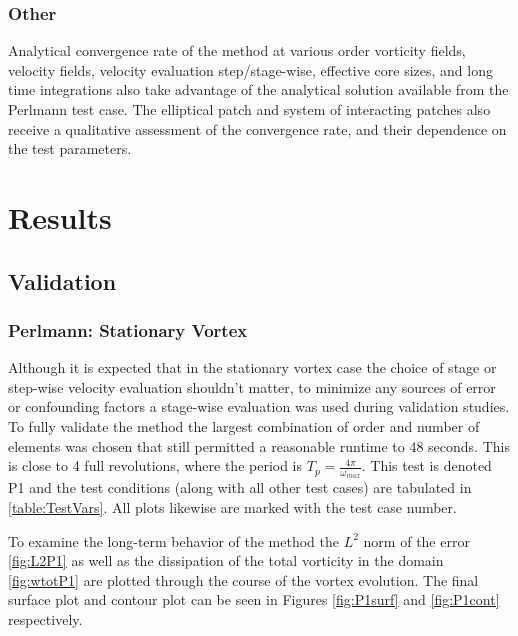 \documentclass[letterpaper,12pt]{report}
\begin{document}
\subsection{Other}
Analytical convergence rate of the method at various order vorticity fields, velocity fields, velocity evaluation step/stage-wise, effective core sizes, and long time integrations also take advantage of the analytical solution available from the Perlmann test case. The elliptical patch and system of interacting  patches also receive a qualitative assessment of the convergence rate, and their dependence on the test parameters.

\chapter{Results}
\section{Validation}
\subsection{Perlmann: Stationary Vortex}
Although it is expected that in the stationary vortex case the choice of stage or step-wise velocity evaluation shouldn't matter, to minimize any sources of error or confounding factors a stage-wise evaluation was used during validation studies. To fully validate the method the largest combination of order and number of elements was chosen that still permitted a reasonable runtime to 48 seconds. This is close to 4 full revolutions, where the period is $T_p = \frac{4 \pi}{\omega_{max}}$. This test is denoted P1 and the test conditions (along with all other test cases) are tabulated in \ref{table:TestVars}. All plots likewise are marked with the test case number.

To examine the long-term behavior of the method the $L^2$ norm of the error \ref{fig:L2P1} as well as the dissipation of the total vorticity in the domain \ref{fig:wtotP1} are plotted through the course of the vortex evolution. The final surface plot and contour plot can be seen in Figures \ref{fig:P1surf} and \ref{fig:P1cont} respectively.
\end{document}
